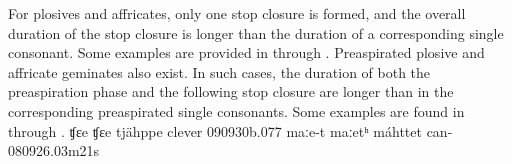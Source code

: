 For plosives and affricates, only one stop closure is formed, and the overall duration of the stop closure is longer than the duration of a corresponding single consonant. Some examples are provided in  through .
Preaspirated plosive and affricate geminates also exist. %
In such cases, the duration of both the preaspiration phase and the following stop closure are longer than in the corresponding preaspirated single consonants. Some examples are found in  through .
		{ʧɛe}		{ʧɛe}		{tjähppe}	{clever\BS{}}		{090930b}{.077}
				{maːe-t}	{maːetʰ}	{máhttet}	{can-}			{080926}{.03m21s}

